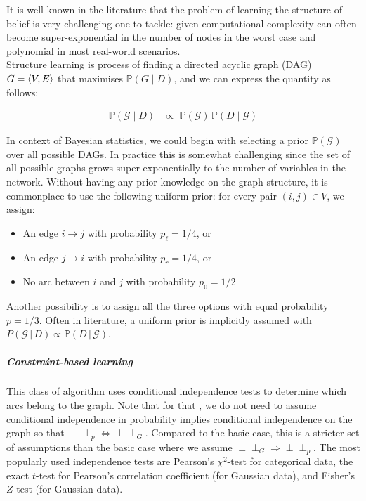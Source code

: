 It is well known in the literature that the problem of learning the structure of belief is very challenging one to tackle: given computational complexity can often become super-exponential in the number of nodes in the worst case and polynomial in most real-world scenarios.\\

Structure learning is process of finding a directed acyclic graph (DAG) $G = \braket{V, E}$ that maximises $\mathbb P(G\mid D)$, and we can express the quantity as follows:

\begin{eqnarray*}
\mathbb P(\mathcal G\mid D)
&\propto\,\, \mathbb P(\mathcal G)\,\mathbb P(D\mid \mathcal G)
\end{eqnarray*}

In context of Bayesian statistics, we could begin with selecting a prior $\mathbb P(\mathcal G)$ over all possible DAGs\cite{castelo2000priors}. In practice this is somewhat challenging since the set of all possible graphs grows super exponentially to the number of variables in the network. Without having any prior knowledge on the graph structure, it is commonplace to use the following uniform prior: for every pair $(i, j) \in V$, we assign:

\begin{itemize}
	\item{An edge $i \to j$ with probability $p_\ell=1/4$, or}
	\item{An edge $j \to i$ with probability $p_r =1/4$, or}
	\item{No arc between $i$ and $j$ with probability $p_0 = 1/2$}
\end{itemize}

Another possibility is to assign all the three options with equal probability $p = 1/3$. Often in literature, a uniform prior is implicitly assumed with $P(\mathcal G\,|\, D)\propto \mathbb P(D\,|\, \mathcal G)$.

\subparagraph{Constraint-based learning}

\label{constraint}

This class of algorithm \cite{scutari2014bayesian} uses conditional independence tests to determine which arcs belong to the graph. Note that for that , we do not need to assume conditional independence in probability implies conditional independence on the graph so that $\perp\!\!\perp_p \Leftrightarrow \perp\!\!\perp_{G}$. Compared to the basic case, this is a stricter set of assumptions than the basic case where we assume $\perp\!\!\perp_G \Rightarrow \perp\!\!\perp_p$. The most popularly used independence tests are Pearson's $\chi^2$-test for categorical data, the exact $t$-test for Pearson's correlation coefficient (for Gaussian data), and Fisher's $Z$-test (for Gaussian data).\\

